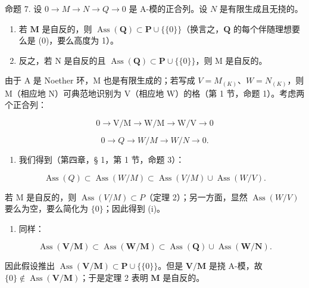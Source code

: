 命题 7. 设 \(0 \to M \to N \to Q \to 0\) 是 A-模的正合列。设 \(N\) 是有限生成且无挠的。

\begin{enumerate}
\def\labelenumi{(\roman{enumi})}
\item
若 \(\mathbf{M}\) 是自反的，则 \(\operatorname{Ass}(\mathbf{Q}) \subset \mathbf{P} \cup \{\{0\}\}\)（换言之，\(\mathbf{Q}\) 的每个伴随理想要么是 (0)，要么高度为 1）。
\item
  反之，若 N 是自反的且 \(\operatorname{Ass}(\mathbf{Q}) \subset \mathbf{P} \cup \{\{0\}\}\)，则 M 是自反的。
\end{enumerate}

由于 A 是 Noether 环，M 也是有限生成的；若写成 \(V = M_{(K)}\)、\(W = N_{(K)}\)，则 M（相应地 N）可典范地识别为 V（相应地 W）的格（第 1 节，命题 1）。考虑两个正合列：

\[
0 \rightarrow \mathrm{V} / \mathrm{M} \rightarrow \mathrm{W} / \mathrm{M} \rightarrow \mathrm{W} / \mathrm{V} \rightarrow 0
\]

\[
0 \rightarrow Q \rightarrow W / M \rightarrow W / N \rightarrow 0.
\]

\begin{enumerate}
\def\labelenumi{(\roman{enumi})}
\tightlist
\item
  我们得到（第四章，§ 1，第 1 节，命题 3）：
\end{enumerate}

\[
\operatorname{Ass} (Q) \subset \operatorname{Ass} (W / M) \subset \operatorname{Ass} (V / M) \cup \operatorname{Ass} (W / V).
\]

若 M 是自反的，则 \(\operatorname{Ass}(V/M) \subset P\)（定理 2）；另一方面，显然 \(\operatorname{Ass}(W/V)\) 要么为空，要么简化为 \(\{0\}\)；因此得到 (i)。

\begin{enumerate}
\def\labelenumi{(\roman{enumi})}
\setcounter{enumi}{1}
\tightlist
\item
  同样：
\end{enumerate}

\[
\operatorname{Ass} (\mathbf {V} / \mathbf {M}) \subset \operatorname{Ass} (\mathbf {W} / \mathbf {M}) \subset \operatorname{Ass} (\mathbf {Q}) \cup \operatorname{Ass} (\mathbf {W} / \mathbf {N}).
\]

因此假设推出 \(\operatorname{Ass}(\mathbf{V} / \mathbf{M}) \subset \mathbf{P} \cup \{\{0\}\}\)。但是 \(\mathbf{V} / \mathbf{M}\) 是挠 A-模，故 \(\{0\} \notin \operatorname{Ass}(\mathbf{V} / \mathbf{M})\)；于是定理 2 表明 \(\mathbf{M}\) 是自反的。

